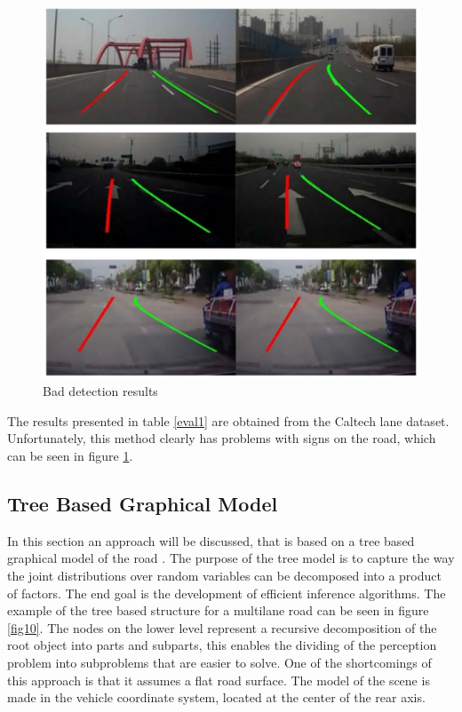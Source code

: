 \documentclass[conference]{IEEEtran}
\begin{document}
\begin{figure}[H]
	\centering
    \includegraphics[scale = 0.5]{pictures/bad_detections.pdf}
	\caption{Bad detection results \cite{ransac}}
	\label{fig6}
\end{figure}



The results presented in table \ref{eval1} are obtained from the Caltech lane dataset. Unfortunately, this method clearly has problems with signs on the road, which can be seen in figure \ref{fig6}.

\subsection{Tree Based Graphical Model}

In this section an approach will be discussed, that is based on a tree based graphical model of the road \cite{lanesystem}. The purpose of the tree model is to capture the way the joint distributions over random variables can be decomposed into a product of factors. The end goal is the development of efficient inference algorithms. The example of the tree based structure for a multilane road can be seen in figure \ref{fig10}.
The nodes on the lower level represent a recursive decomposition of the root object into parts and subparts, this enables the dividing of the perception problem into subproblems that are easier to solve. One of the shortcomings of this approach is that it assumes a flat road surface. The model of the scene is made in the vehicle coordinate system, located at the center of the rear axis. 
\end{document}
